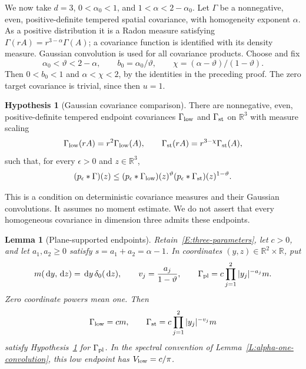 \documentclass[12pt]{article}
\numberwithin{equation}{section}
\newtheorem{lemma}[theorem]{Lemma}
\theoremstyle{definition}
\newtheorem{hypothesis}[theorem]{Hypothesis}
\newcommand{\R}{\mathbb{R}}
\newcommand{\ud}{\,\mathrm{d}}
\begin{document}
We now take $d=3$, $0<\alpha_0<1$, and $1<\alpha<2-\alpha_0$.
Let $\Gamma$ be a nonnegative, even, positive-definite tempered spatial
covariance, with homogeneity exponent $\alpha$. As a positive distribution
it is a Radon measure satisfying
$\Gamma(rA)=r^{3-\alpha}\Gamma(A)$; a covariance function is identified
with its density measure. Gaussian convolution is used for all covariance
products. Choose and fix
\begin{equation}\label{E:three-parameters}
  \alpha_0<\vartheta<2-\alpha,\qquad
  b_0=\alpha_0/\vartheta,\qquad
  \chi=(\alpha-\vartheta)/(1-\vartheta).
\end{equation}
Then $0<b_0<1$ and $\alpha<\chi<2$, by the identities in the preceding
proof. The zero target covariance is trivial, since then $u=1$.

\begin{hypothesis}[Gaussian covariance comparison]\label{H:three-endpoints}
  There are nonnegative, even, positive-definite tempered endpoint
  covariances $\Gamma_{\rm low}$ and $\Gamma_{\rm st}$ on $\R^3$
  with measure scaling
  \[
    \Gamma_{\rm low}(rA)=r^2\Gamma_{\rm low}(A),\qquad
    \Gamma_{\rm st}(rA)=r^{3-\chi}\Gamma_{\rm st}(A),
  \]
  such that, for every $\epsilon>0$ and $z\in\R^3$,
  \begin{equation}\label{E:three-gaussian-comparison}
    (p_\epsilon*\Gamma)(z)
    \le(p_\epsilon*\Gamma_{\rm low})(z)^\vartheta
    (p_\epsilon*\Gamma_{\rm st})(z)^{1-\vartheta}.
  \end{equation}
\end{hypothesis}

This is a condition on deterministic covariance measures and their Gaussian
convolutions. It assumes no moment estimate. We do not assert that every
homogeneous covariance in dimension three admits these endpoints.

\begin{lemma}[Plane-supported endpoints]\label{L:plane-endpoints}
  Retain~\eqref{E:three-parameters}, let $c>0$, and let $a_1,a_2\ge0$
  satisfy $s=a_1+a_2=\alpha-1$. In coordinates $(y,z)\in\R^2\times\R$,
  put
  \[
    m(\ud y,\ud z)=\ud y\,\delta_0(\ud z),\qquad
    v_j=\frac{a_j}{1-\vartheta},\qquad
    \Gamma_{\rm pl}=c\prod_{j=1}^2|y_j|^{-a_j}m.
  \]
  Zero coordinate powers mean one. Then
  \[
    \Gamma_{\rm low}=cm,\qquad
    \Gamma_{\rm st}=c\prod_{j=1}^2|y_j|^{-v_j}m
  \]
  satisfy Hypothesis~\ref{H:three-endpoints} for $\Gamma_{\rm pl}$.
  In the spectral convention of Lemma~\ref{L:alpha-one-convolution},
  this low endpoint has $V_{\rm low}=c/\pi$.
\end{lemma}
\end{document}

